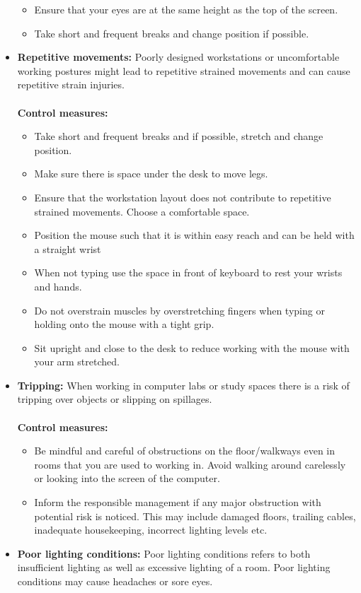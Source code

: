 \documentclass[a4paper,12pt]{report}
\begin{document}
\begin{itemize}
\begin{itemize}
		\item Ensure that your eyes are at the same height as the top of the screen.
		\item Take short and frequent breaks and change position if possible.
	\end{itemize}
	\item \textbf{Repetitive movements:} Poorly designed workstations or uncomfortable working postures might lead to repetitive strained movements and can cause repetitive strain injuries. \\ \\
	\textbf{Control measures:}
	\begin{itemize}
		\item Take short and frequent breaks and if possible, stretch and change position.
		\item Make sure there is space under the desk to move legs.
		\item Ensure that the workstation layout does not contribute to repetitive strained movements. Choose a comfortable space.
		\item Position the mouse such that it is within easy reach and can be held with a straight wrist
		\item When not typing use the space in front of keyboard to rest your wrists and hands.
		\item Do not overstrain muscles by overstretching fingers when typing or holding onto the mouse with a tight grip.
		\item Sit upright and close to the desk to reduce working with the mouse with your arm stretched.
	\end{itemize}
	\item \textbf{Tripping:} When working in computer labs or study spaces there is a risk of tripping over objects or slipping on spillages. \\ \\
	\textbf{Control measures:}
	\begin{itemize}
		\item Be mindful and careful of obstructions on the floor/walkways even in rooms that you are used to working in. Avoid walking around carelessly or looking into the screen of the computer.
		\item Inform the responsible management if any major obstruction with potential risk is noticed. This may include damaged floors, trailing cables, inadequate housekeeping, incorrect lighting levels etc.
	\end{itemize}
	\item 	\textbf{Poor lighting conditions:} Poor lighting conditions refers to both insufficient lighting as well as excessive lighting of a room. Poor lighting conditions may cause headaches or sore eyes.\\ \\

\end{itemize}
\end{document}
